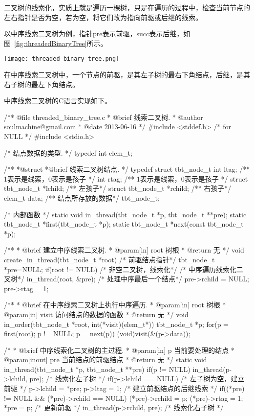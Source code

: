 二叉树的线索化，实质上就是遍历一棵树，只是在遍历的过程中，检查当前节点的左右指针是否为空，若为空，将它们改为指向前驱或后继的线索。

以中序线索二叉树为例，指针pre表示前驱，succ表示后继，如图~\ref{fig:threadedBinaryTree}所示。

\begin{center}
\texttt{[image: threaded-binary-tree.png]} \\
\label{fig:threadedBinaryTree}
\end{center}

在中序线索二叉树中，一个节点的前驱，是其左子树的最右下角结点，后继，是其右子树的最左下角结点。

中序线索二叉树的C语言实现如下。
\begin{Codex}[label=theaded_binary_tree.c]
/** @file threaded_binary_tree.c
  * @brief 线索二叉树.
  * @author soulmachine@gmail.com
  * @date 2013-06-16
  */
#include <stddef.h>    /* for NULL */
#include <stdio.h>

/* 结点数据的类型. */
typedef int elem_t;

 /**
  *@struct
  *@brief 线索二叉树结点.
  */
typedef struct tbt_node_t {
    int ltag; /** 1表示是线索，0表示是孩子 */
    int rtag; /** 1表示是线索，0表示是孩子 */
    struct tbt_node_t *lchild; /** 左孩子*/
    struct tbt_node_t *rchild; /** 右孩子*/
    elem_t data; /** 结点所存放的数据*/
}tbt_node_t;

/* 内部函数 */
static void in_thread(tbt_node_t *p, tbt_node_t **pre);
static tbt_node_t *first(tbt_node_t *p);
static tbt_node_t *next(const tbt_node_t *p);

 /**
  * @brief 建立中序线索二叉树.
  * @param[in] root 树根
  * @return 无
  */
void create_in_thread(tbt_node_t *root) {
    /* 前驱结点指针*/
    tbt_node_t *pre=NULL;
    if(root != NULL) { /* 非空二叉树，线索化*/
        /* 中序遍历线索化二叉树*/
        in_thread(root, &pre);
        /* 处理中序最后一个结点*/
        pre->rchild = NULL;
        pre->rtag = 1;
    }
}


/**
  * @brief 在中序线索二叉树上执行中序遍历.
  * @param[in] root 树根
  * @param[in] visit 访问结点的数据的函数
  * @return 无
  */
void in_order(tbt_node_t *root, int(*visit)(elem_t*)) {
    tbt_node_t *p;
    for(p = first(root); p != NULL; p = next(p)) {
        (void)visit(&(p->data));
    }
}


 /*
  * @brief 中序线索化二叉树的主过程.
  * @param[in] p 当前要处理的结点
  * @param[inout] pre 当前结点的前驱结点
  * @return 无
  */
static void in_thread(tbt_node_t *p, tbt_node_t **pre) {
    if(p != NULL) {
        in_thread(p->lchild, pre); /* 线索化左子树 */
        if(p->lchild == NULL) {  /* 左子树为空，建立前驱 */
            p->lchild = *pre;
            p->ltag = 1;
        }
        /* 建立前驱结点的后继线索 */
        if((*pre) != NULL &&
            (*pre)->rchild == NULL) {
            (*pre)->rchild = p;
            (*pre)->rtag = 1;
        }
        *pre = p; /* 更新前驱 */
        in_thread(p->rchild, pre); /* 线索化右子树 */
    }
}


\end{Codex}
